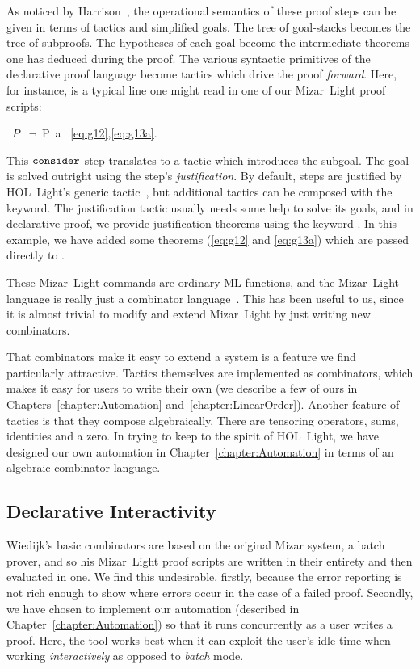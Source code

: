 As noticed by Harrison~\cite{MizarHOL}, the operational semantics of these proof steps can be given in terms of tactics and simplified goals. The tree of goal-stacks becomes the tree of subproofs. The hypotheses of each goal become the intermediate theorems one has deduced during the proof. The various syntactic primitives of the declarative proof language become tactics which drive the proof \emph{forward}. Here, for instance, is a typical line one might read in one of our Mizar~Light proof scripts:
\begin{center}
\ $P$ \ $\neg$\ P\ a \ \eqref{eq:g12},\eqref{eq:g13a}.
\end{center}
This $\texttt{consider}$ step translates to a tactic which introduces the subgoal\linebreak {}. The goal is solved outright using the step's \emph{justification}. By default, steps are justified by HOL~Light's generic  tactic~\cite{HarrisonMESON}, but additional tactics can be composed with the  keyword. The justification tactic usually needs some help to solve its goals, and in declarative proof, we provide justification theorems using the keyword . In this example, we have added some theorems (\ref{eq:g12} and \ref{eq:g13a}) which are passed directly to .

These Mizar~Light commands are ordinary ML functions, and the Mizar~Light language is really just a combinator language~\cite{CombinatorLanguages}. This has been useful to us, since it is almost trivial to modify and extend Mizar~Light by just writing new combinators. 

That combinators make it easy to extend a system is a feature we find particularly attractive. Tactics themselves are implemented as combinators, which makes it easy for users to write their own (we describe a few of ours in Chapters~\ref{chapter:Automation} and~\ref{chapter:LinearOrder}). Another feature of tactics is that they compose algebraically. There are tensoring operators, sums, identities and a zero. In trying to keep to the spirit of HOL~Light, we have designed our own automation in Chapter~\ref{chapter:Automation} in terms of an algebraic combinator language.

\subsection{Declarative Interactivity}\label{sec:MizarLightExtend}
Wiedijk's basic combinators are based on the original Mizar system, a batch prover, and so his Mizar~Light proof scripts are written in their entirety and then evaluated in one. We find this undesirable, firstly, because the error reporting is not rich enough to show where errors occur in the case of a failed proof. Secondly, we have chosen to implement our automation (described in Chapter~\ref{chapter:Automation}) so that it runs concurrently as a user writes a proof. Here, the tool works best when it can exploit the user's idle time when working \emph{interactively} as opposed to \emph{batch} mode.

